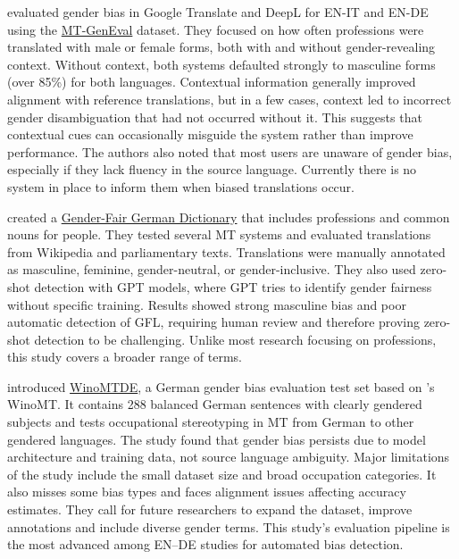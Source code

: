 \textbf{\citet{rescignoGenderBiasMachine2023}} evaluated gender bias in Google Translate and DeepL for EN-IT and EN-DE using the \href{https://github.com/amazon-science/machine-translation-gender-eval}{MT-GenEval} dataset. They focused on how often professions were translated with male or female forms, both with and without gender-revealing context. Without context, both systems defaulted strongly to masculine forms (over 85\%) for both languages. Contextual information generally improved alignment with reference translations, but in a few cases, context led to incorrect gender disambiguation that had not occurred without it. This suggests that contextual cues can occasionally misguide the system rather than improve performance. The authors also noted that most users are unaware of gender bias, especially if they lack fluency in the source language. Currently there is no system in place to inform them when biased translations occur.

\textbf{\citet{lardelliBuildingBridgesDataset2024}} created a \href{https://github.com/g8a9/building-bridges-gender-fair-german-mt}{Gender-Fair German Dictionary} that includes professions and common nouns for people. They tested several MT systems and evaluated translations from Wikipedia and parliamentary texts. Translations were manually annotated as masculine, feminine, gender-neutral, or gender-inclusive. They also used zero-shot detection with GPT models, where GPT tries to identify gender fairness without specific training. Results showed strong masculine bias and poor automatic detection of GFL, requiring human review and therefore proving zero-shot detection to be challenging. Unlike most research focusing on professions, this study covers a broader range of terms.

\textbf{\citet{kapplAreAllSpanish2025}} introduced \href{https://github.com/michellekappl/mt_gender_german}{WinoMTDE}, a German gender bias evaluation test set based on \citealp{stanovskyEvaluatingGenderBias2019}'s WinoMT. It contains 288 balanced German sentences with clearly gendered subjects and tests occupational stereotyping in MT from German to other gendered languages. The study found that gender bias persists due to model architecture and training data, not source language ambiguity. Major limitations of the study include the small dataset size and broad occupation categories. It also misses some bias types and faces alignment issues affecting accuracy estimates. They call for future researchers to expand the dataset, improve annotations and include diverse gender terms. This study's evaluation pipeline is the most advanced among EN–DE studies for automated bias detection.

